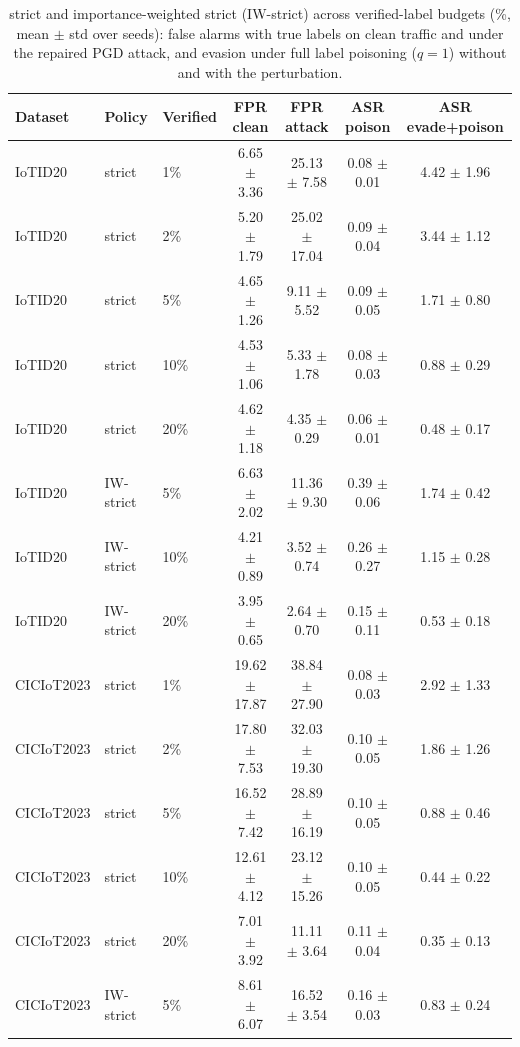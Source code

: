 \begin{table}[t]
\centering
\caption{strict and importance-weighted strict (IW-strict) across verified-label budgets (\%, mean $\pm$ std over seeds): false alarms with true labels on clean traffic and under the repaired PGD attack, and evasion under full label poisoning ($q=1$) without and with the perturbation.}
\label{tab:audit}
\footnotesize
\setlength{\tabcolsep}{3pt}
\begin{tabular}{lllcccc}
\toprule
Dataset & Policy & Verified & FPR clean & FPR attack & ASR poison & ASR evade+poison \\
\midrule
IoTID20 & strict & 1\% & 6.65 $\pm$ 3.36 & 25.13 $\pm$ 7.58 & 0.08 $\pm$ 0.01 & 4.42 $\pm$ 1.96 \\
IoTID20 & strict & 2\% & 5.20 $\pm$ 1.79 & 25.02 $\pm$ 17.04 & 0.09 $\pm$ 0.04 & 3.44 $\pm$ 1.12 \\
IoTID20 & strict & 5\% & 4.65 $\pm$ 1.26 & 9.11 $\pm$ 5.52 & 0.09 $\pm$ 0.05 & 1.71 $\pm$ 0.80 \\
IoTID20 & strict & 10\% & 4.53 $\pm$ 1.06 & 5.33 $\pm$ 1.78 & 0.08 $\pm$ 0.03 & 0.88 $\pm$ 0.29 \\
IoTID20 & strict & 20\% & 4.62 $\pm$ 1.18 & 4.35 $\pm$ 0.29 & 0.06 $\pm$ 0.01 & 0.48 $\pm$ 0.17 \\
IoTID20 & IW-strict & 5\% & 6.63 $\pm$ 2.02 & 11.36 $\pm$ 9.30 & 0.39 $\pm$ 0.06 & 1.74 $\pm$ 0.42 \\
IoTID20 & IW-strict & 10\% & 4.21 $\pm$ 0.89 & 3.52 $\pm$ 0.74 & 0.26 $\pm$ 0.27 & 1.15 $\pm$ 0.28 \\
IoTID20 & IW-strict & 20\% & 3.95 $\pm$ 0.65 & 2.64 $\pm$ 0.70 & 0.15 $\pm$ 0.11 & 0.53 $\pm$ 0.18 \\
CICIoT2023 & strict & 1\% & 19.62 $\pm$ 17.87 & 38.84 $\pm$ 27.90 & 0.08 $\pm$ 0.03 & 2.92 $\pm$ 1.33 \\
CICIoT2023 & strict & 2\% & 17.80 $\pm$ 7.53 & 32.03 $\pm$ 19.30 & 0.10 $\pm$ 0.05 & 1.86 $\pm$ 1.26 \\
CICIoT2023 & strict & 5\% & 16.52 $\pm$ 7.42 & 28.89 $\pm$ 16.19 & 0.10 $\pm$ 0.05 & 0.88 $\pm$ 0.46 \\
CICIoT2023 & strict & 10\% & 12.61 $\pm$ 4.12 & 23.12 $\pm$ 15.26 & 0.10 $\pm$ 0.05 & 0.44 $\pm$ 0.22 \\
CICIoT2023 & strict & 20\% & 7.01 $\pm$ 3.92 & 11.11 $\pm$ 3.64 & 0.11 $\pm$ 0.04 & 0.35 $\pm$ 0.13 \\
CICIoT2023 & IW-strict & 5\% & 8.61 $\pm$ 6.07 & 16.52 $\pm$ 3.54 & 0.16 $\pm$ 0.03 & 0.83 $\pm$ 0.24 \\

\end{tabular}
\end{table}
